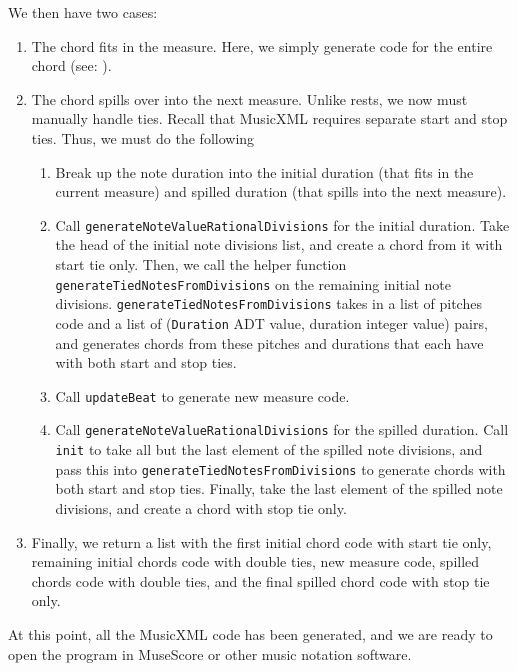 \documentclass{report}
\begin{document}
We then have two cases:
\begin{enumerate}
\item The chord fits in the measure. Here, we simply generate code for the entire chord (see: ).

\item The chord spills  over into the  next measure. Unlike rests, we now must manually handle ties. Recall that MusicXML requires separate start and stop ties. Thus, we must do the following
\begin{enumerate}
\item Break up the note duration into the initial duration (that fits in the current measure) and spilled duration (that spills into the next measure). 

\item Call \verb.generateNoteValueRationalDivisions. for the initial duration. Take the head of the initial note divisions list, and create a chord from it with start tie only. Then, we call the helper function \verb.generateTiedNotesFromDivisions. on the remaining initial note divisions. \verb.generateTiedNotesFromDivisions. takes in a list of pitches code and a list of (\verb.Duration. ADT value, duration integer value) pairs, and generates chords from these pitches and durations that each have with both start and stop ties.

\item Call \verb.updateBeat. to generate new measure code. 

\item Call \verb.generateNoteValueRationalDivisions. for the spilled duration. Call \verb.init. to take all but the last element of the spilled note divisions, and pass this into \verb.generateTiedNotesFromDivisions. to generate chords with both start and stop ties. Finally, take the last element of the spilled note divisions, and create a chord with stop tie only.
\end{enumerate}

\item Finally, we return a list with the first initial chord code with start tie only, remaining initial chords code with double ties, new measure code,  spilled chords code with double ties, and the final spilled chord code with stop tie only.
\end{enumerate}



At this point, all the MusicXML code has been generated, and we are ready to open the program in MuseScore or other music notation software.
\end{document}
